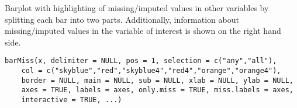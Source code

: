 %
\begin{Description}\relax
Barplot with highlighting of missing/imputed values in other variables by splitting 
each bar into two parts.  Additionally, information about missing/imputed values in 
the variable of interest is shown on the right hand side.
\end{Description}
%
\begin{Usage}
\begin{verbatim}
barMiss(x, delimiter = NULL, pos = 1, selection = c("any","all"),
    col = c("skyblue","red","skyblue4","red4","orange","orange4"),
    border = NULL, main = NULL, sub = NULL,	xlab = NULL, ylab = NULL,
    axes = TRUE, labels = axes, only.miss = TRUE, miss.labels = axes,
    interactive = TRUE, ...)
\end{verbatim}
\end{Usage}
%
